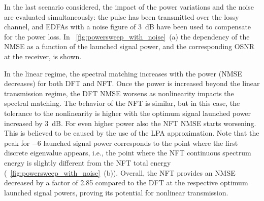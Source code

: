 In the last scenario considered, the impact of the power variations and the noise are
evaluated simultaneously: the pulse has been transmitted over the lossy channel, and \acp{EDFA} with a
noise figure of \SI{3}{\dB} have been used to compensate for the power loss. In
\figurename~\ref{fig:powersweep_with_noise}~(a) the dependency of the \ac{NMSE} as a function of
the launched signal power, and the corresponding \ac{OSNR} at the receiver, is shown.

In the linear regime, the spectral matching increases with the power
(\ac{NMSE} decreases) for both \ac{DFT} and \ac{NFT}. Once the power is increased beyond
the linear transmission regime, the \ac{DFT} \ac{NMSE} worsens as nonlinearity impacts the
spectral matching. The behavior of the \ac{NFT} is similar, but in this case, the
tolerance to the nonlinearity is higher with the optimum signal launched power increased by
\SI{3}{\dB}. %
For even higher power
also the \ac{NFT} \ac{NMSE} starts worsening. This is believed to be caused by the
use of the \ac{LPA} approximation.
 Note that the peak for \SI{-6}{\dBm} launched signal power corresponds to the point where the
first discrete eigenvalue appears, i.e., the point where the \ac{NFT} continuous
spectrum energy is slightly different from the \ac{NFT} total energy
(\figurename~\ref{fig:powersweep_with_noise}~(b)). Overall, the
\ac{NFT} provides an \ac{NMSE} decreased by a factor of 2.85 compared to the \ac{DFT} at the
respective optimum launched signal powers, proving its potential for nonlinear
transmission.
%


